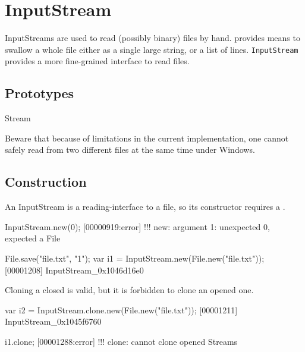 
\section{InputStream}

InputStreams are used to read (possibly binary) files by hand.
 provides means to swallow a whole file either as a
single large string, or a list of lines.  \lstinline|InputStream|
provides a more fine-grained interface to read files.

\subsection{Prototypes}
\begin{refObjects}
\item[Stream]
\end{refObjects}

\begin{windows}
  Beware that because of limitations in the current implementation,
  one cannot safely read from two different files at the same time
  under Windows.
\end{windows}

\subsection{Construction}

An InputStream is a reading-interface to a file, so its constructor
requires a .

\begin{urbiscript}[firstnumber=1]
InputStream.new(0);
[00000919:error] !!! new: argument 1: unexpected 0, expected a File

File.save("file.txt", "1\n");
var i1 = InputStream.new(File.new("file.txt"));
[00001208] InputStream_0x1046d16e0
\end{urbiscript}

Cloning a closed  is valid, but it is forbidden to clone an
opened one.

\begin{urbiscript}
var i2 = InputStream.clone.new(File.new("file.txt"));
[00001211] InputStream_0x1045f6760

i1.clone;
[00001288:error] !!! clone: cannot clone opened Streams
\end{urbiscript}

